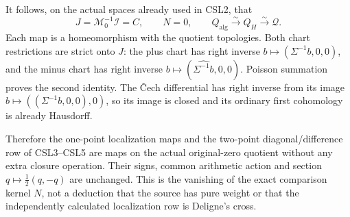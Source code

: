 It follows, on the actual spaces already used in CSL2, that \[
J=\mathcal M_0^{-1}\mathcal I=C,\qquad N=0,
\qquad Q_{\mathrm{alg}}\xrightarrow{\sim}Q_H\xrightarrow{\sim}\mathcal Q.
\tag{CSL10.3}
\] Each map is a homeomorphism with the quotient topologies. Both chart
restrictions are strict onto \(J\): the plus chart has right inverse
\(b\mapsto(\Sigma^{-1}b,0,0)\), and the minus chart has right inverse
\(b\mapsto(\widehat{\Sigma^{-1}b},0,0)\). Poisson summation proves the
second identity. The Čech differential has right inverse from its image
\(b\mapsto((\Sigma^{-1}b,0,0),0)\), so its image is closed and its
ordinary first cohomology is already Hausdorff.

Therefore the one-point localization maps and the two-point
diagonal/difference row of CSL3--CSL5 are maps on the actual
original-zero quotient without any extra closure operation. Their signs,
common arithmetic action and section \(q\mapsto\tfrac12(q,-q)\) are
unchanged. This is the vanishing of the exact comparison kernel \(N\),
not a deduction that the source has pure weight or that the
independently calculated localization row is Deligne's cross.
